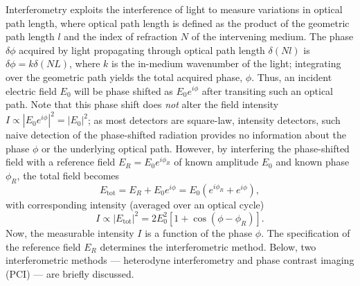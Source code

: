 Interferometry exploits the interference of light
to measure variations in optical path length, where
optical path length is defined as the product of
the geometric path length $l$ and
the index of refraction $N$ of the intervening medium.
The phase $\delta \phi$ acquired by light propagating through
optical path length $\delta(Nl)$ is
$\delta\phi = k \delta(NL)$, where
$k$ is the in-medium wavenumber of the light;
integrating over the geometric path
yields the total acquired phase, $\phi$.
Thus, an incident electric field $E_0$
will be phase shifted as $E_0 e^{i \phi}$
after transiting such an optical path.
Note that this phase shift does \emph{not} alter
the field intensity $I \propto |E_0 e^{i \phi}|^2 = |E_0|^2$;
as most detectors are square-law, intensity detectors,
such naive detection of the phase-shifted radiation
provides no information about the phase $\phi$
or the underlying optical path.
However, by interfering the phase-shifted field with
a reference field $E_R = E_0 e^{i \phi_R}$ of
known amplitude $E_0$ and known phase $\phi_R$,
the total field becomes
\begin{equation}
  E_{\text{tot}}
  =
  E_R + E_0 e^{i \phi}
  =
  E_0 \left( e^{i \phi_R} + e^{i \phi} \right),
  \label{eq:Introduction:OpticalInterferometry:generic_interferometer_electric_field}
\end{equation}
with corresponding intensity (averaged over an optical cycle)
\begin{equation}
  I
  \propto
  |E_{\text{tot}}|^2
  =
  2 E_0^2 \left[
    1 + \cos\left( \phi - \phi_R \right)
  \right].
  \label{eq:Introduction:OpticalInterferometry:generic_interferometer_intensity}
\end{equation}
Now, the measurable intensity $I$
is a function of the phase $\phi$.
The specification of the reference field $E_R$
determines the interferometric method.
Below, two interferometric methods ---
heterodyne interferometry and phase contrast imaging (PCI) ---
are briefly discussed.


